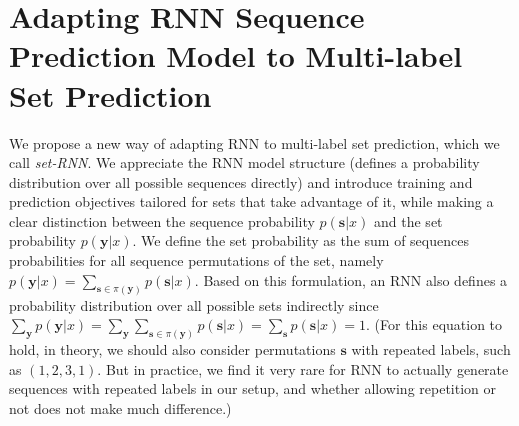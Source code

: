 
\section{Adapting RNN Sequence Prediction Model to Multi-label Set Prediction}
\label{sec:Model}

We propose a new way of adapting RNN to multi-label set prediction, which we call \emph{set-RNN}. We appreciate the RNN model structure \cite{rumelhart1988learning} (defines a probability distribution over all possible sequences directly) and introduce training and prediction objectives tailored for sets that take advantage of it, while making a clear distinction between the sequence probability $p(\mathbf{s}|x)$ and the set probability $p(\mathbf{y}|x)$. 
 We define the set probability as the sum of sequences probabilities for all sequence permutations of the set, namely $p(\mathbf{y}|x)=\sum_{\mathbf{s}\in \pi(\mathbf{y})} p(\mathbf{s}|x)$. Based on this formulation, an RNN also defines a probability distribution over all possible sets indirectly since $\sum_{\mathbf{y}} p(\mathbf{y}|x)=\sum_{\mathbf{y}}\sum_{\mathbf{s}\in \pi(\mathbf{y})} p(\mathbf{s}|x)=\sum_{\mathbf{s}} p(\mathbf{s}|x)=1$.  (For this equation to hold, in theory, we should also consider permutations $\mathbf{s}$ with repeated labels, such as $(1,2,3,1)$. But in practice, we find it very rare for RNN to actually generate sequences with repeated labels in our setup, and whether allowing repetition or not does not make much difference.)
 

